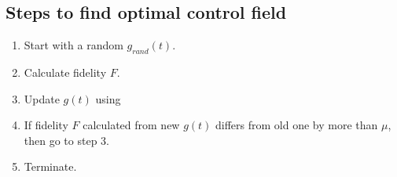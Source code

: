 \subsection{Steps to find optimal control field }
\begin{enumerate}
    \item Start with a random $g_{rand}(t)$.
    \item Calculate fidelity $F$.
    \item Update $g(t) $ using  
    \item If fidelity $F$ calculated from new $g(t) $ differs from old one by more than $\mu$, then go to step 3.
    \item Terminate.
\end{enumerate}



